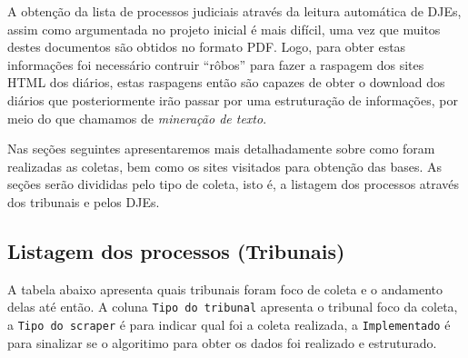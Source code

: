 \documentclass[12pt]{article}
\begin{document}
A obtenção da lista de processos judiciais através da leitura automática
de DJEs, assim como argumentada no projeto inicial é mais difícil, uma
vez que muitos destes documentos são obtidos no formato PDF. Logo, para
obter estas informações foi necessário contruir ``rôbos'' para fazer a
raspagem dos sites HTML dos diários, estas raspagens então são capazes
de obter o download dos diários que posteriormente irão passar por uma
estruturação de informações, por meio do que chamamos de \emph{mineração
de texto}.

Nas seções seguintes apresentaremos mais detalhadamente sobre como foram
realizadas as coletas, bem como os sites visitados para obtenção das
bases. As seções serão divididas pelo tipo de coleta, isto é, a listagem
dos processos através dos tribunais e pelos DJEs.

\subsection{Listagem dos processos
(Tribunais)}\label{listagem-dos-processos-tribunais}

A tabela abaixo apresenta quais tribunais foram foco de coleta e o
andamento delas até então. A coluna \texttt{Tipo\ do\ tribunal}
apresenta o tribunal foco da coleta, a \texttt{Tipo\ do\ scraper} é para
indicar qual foi a coleta realizada, a \texttt{Implementado} é para
sinalizar se o algoritimo para obter os dados foi realizado e
estruturado.
\end{document}
